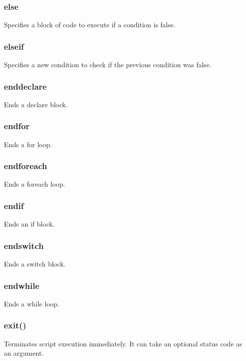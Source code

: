 \documentclass{report}
\begin{document}
    \bigbreak \noindent 
    \subsubsection{else}
    \bigbreak \noindent 
    Specifies a block of code to execute if a condition is false.

    \bigbreak \noindent 
    \subsubsection{elseif}
    \bigbreak \noindent 
    Specifies a new condition to check if the previous condition was false.

    \bigbreak \noindent 
    \subsubsection{enddeclare}
    \bigbreak \noindent 
    Ends a declare block.

    \bigbreak \noindent 
    \subsubsection{endfor}
    \bigbreak \noindent 
    Ends a for loop.

    \bigbreak \noindent 
    \subsubsection{endforeach}
    \bigbreak \noindent 
    Ends a foreach loop.

    \bigbreak \noindent 
    \subsubsection{endif}
    \bigbreak \noindent 
    Ends an if block.

    \bigbreak \noindent 
    \subsubsection{endswitch}
    \bigbreak \noindent 
    Ends a switch block.

    \bigbreak \noindent 
    \subsubsection{endwhile}
    \bigbreak \noindent 
     Ends a while loop.

    \bigbreak \noindent 
    \subsubsection{exit()}
    \bigbreak \noindent 
    Terminates script execution immediately. It can take an optional status code as an argument.
\end{document}

